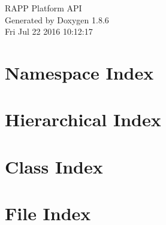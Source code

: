 \documentclass[twoside]{book}
\newcommand{\clearemptydoublepage}{%
  \newpage{\pagestyle{empty}\cleardoublepage}%
}
\begin{document}
\hypersetup{pageanchor=false}
\begin{titlepage}
\vspace*{7cm}
\begin{center}%
{\Large R\-A\-P\-P Platform A\-P\-I }\\
\vspace*{1cm}
{\large Generated by Doxygen 1.8.6}\\
\vspace*{0.5cm}
{\small Fri Jul 22 2016 10:12:17}\\
\end{center}
\end{titlepage}
\clearemptydoublepage
\tableofcontents
\clearemptydoublepage
{}
\hypersetup{pageanchor=true}

\chapter{Namespace Index}

\chapter{Hierarchical Index}

\chapter{Class Index}

\chapter{File Index}

\end{document}
